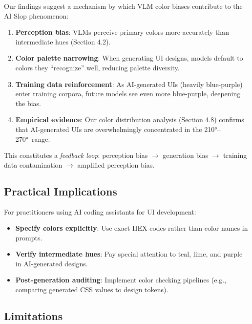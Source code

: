 \documentclass[11pt,a4paper]{article}
\begin{document}
Our findings suggest a mechanism by which VLM color biases contribute to the AI Slop phenomenon:

\begin{enumerate}
    \item \textbf{Perception bias}: VLMs perceive primary colors more accurately than intermediate hues (Section 4.2).
    \item \textbf{Color palette narrowing}: When generating UI designs, models default to colors they ``recognize'' well, reducing palette diversity.
    \item \textbf{Training data reinforcement}: As AI-generated UIs (heavily blue-purple) enter training corpora, future models see even more blue-purple, deepening the bias.
    \item \textbf{Empirical evidence}: Our color distribution analysis (Section 4.8) confirms that AI-generated UIs are overwhelmingly concentrated in the 210°--270°\ range.
\end{enumerate}

This constitutes a \textit{feedback loop}: perception bias $\rightarrow$ generation bias $\rightarrow$ training data contamination $\rightarrow$ amplified perception bias.

\subsection{Practical Implications}

For practitioners using AI coding assistants for UI development:
\begin{itemize}
    \item \textbf{Specify colors explicitly}: Use exact HEX codes rather than color names in prompts.
    \item \textbf{Verify intermediate hues}: Pay special attention to teal, lime, and purple in AI-generated designs.
    \item \textbf{Post-generation auditing}: Implement color checking pipelines (e.g., comparing generated CSS values to design tokens).
\end{itemize}

\subsection{Limitations}
\end{document}
